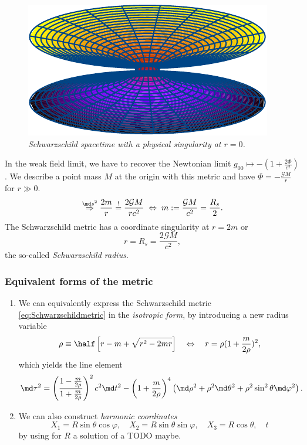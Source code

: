 \begin{figure}
	\centering
	\includegraphics[width=0.7\linewidth]{gfx/schwarzschildMetric}
	\caption{\itshape Schwarzschild spacetime with a physical singularity at $r=0$.}
	\label{fig:schwarzschildmetric}
\end{figure}
In the weak field limit, we have to recover the Newtonian limit $g_{00} \mapsto - (1+\frac{2 \Phi}{c^2})$. We describe a point mass $M$ at the origin with this metric and have $\Phi=-\frac{\mathcal{G}M}{r}$ for $r\gg0$.
\begin{equation}
	\stackrel{\md s^2}{\Rightarrow} \frac{2m}{r} \stackrel{!}{=} \frac{2 \mathcal{G}M}{r c^2} \; \Leftrightarrow\; m:= \frac{\mathcal{G}M}{c^2} = \frac{R_s}{2}.
\end{equation}
The Schwarzschild metric has a coordinate singularity at $r=2m$ or
\begin{equation}
	r=R_s= \frac{2 \mathcal{G}M}{c^2},
\end{equation}
the so-called \emph{Schwarzschild radius}.

\subsubsection{Equivalent forms of the metric}
\begin{enumerate}
	\item We can equivalently express the Schwarzschild metric \ref{eq:Schwarzschildmetric} in the \emph{isotropic form}, by introducing a new radius variable
	\begin{equation}
	\rho \equiv \half \left[r-m+\sqrt{r^2- 2mr}\right] \quad \Leftrightarrow\quad r = \rho (1 + \frac{m}{2 \rho})^2,
	\end{equation}
	which yields the line element
	\begin{equation}
		\md \tau^2 = \left(\frac{1 - \frac{m}{2 \rho}}{1+\frac{m}{2 \rho}}\right)^2 c^2 \md t^2 - \left(1+\frac{m}{2 \rho}\right)^4 \left(\md \rho^2 + \rho^2 \md \theta^2 + \rho^2 \sin^2 \theta \md \varphi^2\right).
	\end{equation}
	\item We can also construct \emph{harmonic coordinates}
	\begin{equation}
		X_1 = R\sin\theta \cos \varphi , \quad X_2 = R\sin\theta\sin\varphi,\quad X_3=R\cos\theta,\quad t
	\end{equation}
	by using for $R$ a solution of a TODO maybe.
\end{enumerate}

